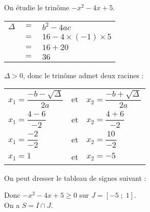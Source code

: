 \vspace*{.3cm}

On étudie le trinôme $-x^2 -4x + 5$. \\

\begin{tabular}{lll}
$\Delta$ & $=$ & $b^2 - 4ac$ \\
& $=$ & $16 - 4 \times \left(-1\right) \times 5$ \\
& $=$ & $16 + 20$ \\
& $=$ & $36$ \\ 
\end{tabular}

\vspace*{.3cm}

$\Delta > 0$, donc le trinôme admet deux racines : \\

\begin{tabular}{lll}
$x_1 = \dfrac{-b - \sqrt{\Delta}}{2a}$ & et & $x_2 = \dfrac{-b + \sqrt{\Delta}}{2a}$ \vspace*{.3cm} \\
$x_1 = \dfrac{4 - 6}{-2}$ & et & $x_2 = \dfrac{4 + 6}{-2}$ \vspace*{.3cm} \\
$x_1 = \dfrac{-2}{-2}$ & et & $x_2 = \dfrac{10}{-2}$ \vspace*{.3cm} \\
$x_1 = 1$ & et & $x_2 = -5$ \vspace*{.3cm} \\
\end{tabular}

On peut dresser le tableau de signes suivant : \\


\vspace*{.3cm}

Donc $-x^2 - 4x + 5 \geqslant 0$ sur $J = \left[-5\; ; \; 1\right]$. \\

On a $S = I \cap J$. \\

